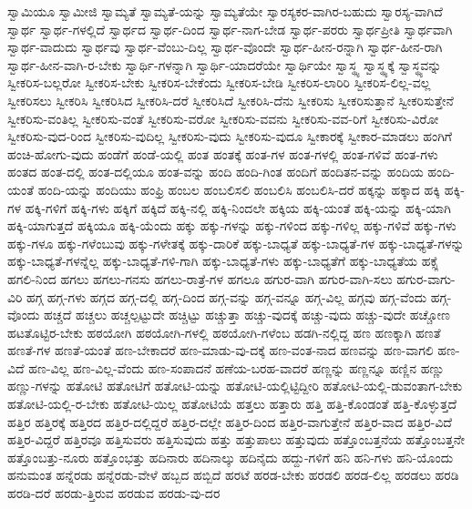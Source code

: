 {ಸ್ವಾಮಿಯೂ
ಸ್ವಾಮೀಜಿ
ಸ್ವಾಮ್ಯತೆ
ಸ್ವಾಮ್ಯತೆ-ಯನ್ನು
ಸ್ವಾಮ್ಯತೆಯೇ
ಸ್ವಾರಸ್ಯಕರ-ವಾಗಿರ-ಬಹುದು
ಸ್ವಾರಸ್ಯ-ವಾಗಿದೆ
ಸ್ವಾರ್ಥ
ಸ್ವಾರ್ಥ-ಗಳಲ್ಲಿದೆ
ಸ್ವಾರ್ಥದ
ಸ್ವಾರ್ಥ-ದಿಂದ
ಸ್ವಾರ್ಥ-ನಾಗ-ಬೇಡ
ಸ್ವಾರ್ಥ-ಪರರು
ಸ್ವಾರ್ಥಪ್ರೀತಿ
ಸ್ವಾರ್ಥವಾಗಿ
ಸ್ವಾರ್ಥ-ವಾದುದು
ಸ್ವಾರ್ಥವು
ಸ್ವಾರ್ಥ-ವೆಂಬು-ದಿಲ್ಲ
ಸ್ವಾರ್ಥ-ವೊಂದೇ
ಸ್ವಾರ್ಥ-ಹೀನ-ರನ್ನಾಗಿ
ಸ್ವಾರ್ಥ-ಹೀನ-ರಾಗಿ
ಸ್ವಾರ್ಥ-ಹೀನ-ವಾಗಿ-ರ-ಬೇಕು
ಸ್ವಾರ್ಥಿ-ಗಳನ್ನಾಗಿ
ಸ್ವಾರ್ಥಿ-ಯಾದರೆಯೇ
ಸ್ವಾರ್ಥಿಯೇ
ಸ್ವಾಸ್ಥ್ಯ
ಸ್ವಾಸ್ಥ್ಯಕ್ಕೆ
ಸ್ವಾಸ್ಥ್ಯವನ್ನು
ಸ್ವೀಕರಿಸ-ಬಲ್ಲರೋ
ಸ್ವೀಕರಿಸ-ಬೇಕು
ಸ್ವೀಕರಿಸ-ಬೇಕೆಂದು
ಸ್ವೀಕರಿಸ-ಬೇಡಿ
ಸ್ವೀಕರಿಸ-ಲಾರಿರಿ
ಸ್ವೀಕರಿಸ-ಲಿಲ್ಲ-ವಲ್ಲ
ಸ್ವೀಕರಿಸಲು
ಸ್ವೀಕರಿಸಿ
ಸ್ವೀಕರಿಸಿದ
ಸ್ವೀಕರಿಸಿ-ದರೆ
ಸ್ವೀಕರಿಸಿದೆ
ಸ್ವೀಕರಿಸಿ-ದೆನು
ಸ್ವೀಕರಿಸು
ಸ್ವೀಕರಿಸುತ್ತಾನೆ
ಸ್ವೀಕರಿಸುತ್ತೇನೆ
ಸ್ವೀಕರಿಸು-ವಂತಿಲ್ಲ
ಸ್ವೀಕರಿಸು-ವಂತೆ
ಸ್ವೀಕರಿಸು-ವರೋ
ಸ್ವೀಕರಿಸು-ವವನು
ಸ್ವೀಕರಿಸು-ವವ-ರಿಗೆ
ಸ್ವೀಕರಿಸು-ವಿರೋ
ಸ್ವೀಕರಿಸು-ವುದ-ರಿಂದ
ಸ್ವೀಕರಿಸು-ವುದಿಲ್ಲ
ಸ್ವೀಕರಿಸು-ವುದು
ಸ್ವೀಕರಿಸು-ವುದೂ
ಸ್ವೀಕಾರಕ್ಕೆ
ಸ್ವೀಕಾರ-ಮಾಡಲು
ಹಂಗಿಗೆ
ಹಂಚಿ-ಹೋಗು-ವುದು
ಹಂಡೆಗೆ
ಹಂಡೆ-ಯಲ್ಲಿ
ಹಂತ
ಹಂತಕ್ಕೆ
ಹಂತ-ಗಳ
ಹಂತ-ಗಳಲ್ಲಿ
ಹಂತ-ಗಳಿವೆ
ಹಂತ-ಗಳು
ಹಂತದ
ಹಂತ-ದಲ್ಲಿ
ಹಂತ-ದಲ್ಲಿಯೂ
ಹಂತ-ವನ್ನು
ಹಂದಿ
ಹಂದಿ-ಗಿಂತ
ಹಂದಿಗೆ
ಹಂದಿತನ-ವನ್ನು
ಹಂದಿಯ
ಹಂದಿ-ಯಂತೆ
ಹಂದಿ-ಯನ್ನು
ಹಂದಿಯು
ಹಂಫ್ರಿ
ಹಂಬಲ
ಹಂಬಲಿಸಲಿ
ಹಂಬಲಿಸಿ
ಹಂಬಲಿಸಿ-ದರೆ
ಹಕ್ಕನ್ನು
ಹಕ್ಕಾದ
ಹಕ್ಕಿ
ಹಕ್ಕಿ-ಗಳ
ಹಕ್ಕಿ-ಗಳಿಗೆ
ಹಕ್ಕಿ-ಗಳು
ಹಕ್ಕಿಗೆ
ಹಕ್ಕಿದೆ
ಹಕ್ಕಿ-ನಲ್ಲಿ
ಹಕ್ಕಿ-ನಿಂದಲೇ
ಹಕ್ಕಿಯ
ಹಕ್ಕಿ-ಯಂತೆ
ಹಕ್ಕಿ-ಯನ್ನು
ಹಕ್ಕಿ-ಯಾಗಿ
ಹಕ್ಕಿ-ಯಾಗುತ್ತದೆ
ಹಕ್ಕಿಯೂ
ಹಕ್ಕಿ-ಯೆಂದು
ಹಕ್ಕು
ಹಕ್ಕು-ಗಳನ್ನು
ಹಕ್ಕು-ಗಳಿಂದ
ಹಕ್ಕು-ಗಳಿಲ್ಲ
ಹಕ್ಕು-ಗಳಿವೆ
ಹಕ್ಕು-ಗಳು
ಹಕ್ಕು-ಗಳೂ
ಹಕ್ಕು-ಗಳೆಂಬುವು
ಹಕ್ಕು-ಗಳೇತಕ್ಕೆ
ಹಕ್ಕು-ದಾರಿಕೆ
ಹಕ್ಕು-ಬಾಧ್ಯತೆ
ಹಕ್ಕು-ಬಾಧ್ಯತೆ-ಗಳ
ಹಕ್ಕು-ಬಾಧ್ಯತೆ-ಗಳನ್ನು
ಹಕ್ಕು-ಬಾಧ್ಯತೆ-ಗಳನ್ನೆಲ್ಲ
ಹಕ್ಕು-ಬಾಧ್ಯತೆ-ಗಳಿ-ಗಾಗಿ
ಹಕ್ಕು-ಬಾಧ್ಯತೆ-ಗಳು
ಹಕ್ಕು-ಬಾಧ್ಯತೆಗೆ
ಹಕ್ಕು-ಬಾಧ್ಯತೆಯ
ಹಕ್ಸ್ಲೆ
ಹಗಲಿ-ನಿಂದ
ಹಗಲು
ಹಗಲು-ಗನಸು
ಹಗಲು-ರಾತ್ರೆ-ಗಳ
ಹಗಲೂ
ಹಗುರ-ವಾಗಿ
ಹಗುರ-ವಾಗಿ-ಸಲು
ಹಗುರ-ವಾಗು-ವಿರಿ
ಹಗ್ಗ
ಹಗ್ಗ-ಗಳು
ಹಗ್ಗದ
ಹಗ್ಗ-ದಲ್ಲಿ
ಹಗ್ಗ-ದಿಂದ
ಹಗ್ಗ-ವನ್ನು
ಹಗ್ಗ-ವನ್ನೂ
ಹಗ್ಗ-ವಿಲ್ಲ
ಹಗ್ಗವು
ಹಗ್ಗ-ವೆಂದು
ಹಗ್ಗ-ವೊಂದು
ಹಚ್ಚದೆ
ಹಚ್ಚಲು
ಹಚ್ಚಲ್ಪಟ್ಟುದೇ
ಹಚ್ಚಿಟ್ಟು
ಹಚ್ಚುತ್ತಾ
ಹಚ್ಚು-ವುದಕ್ಕೆ
ಹಚ್ಚು-ವುದು
ಹಚ್ಚು-ವುದೇ
ಹಚ್ಚೋಣ
ಹಟತೊಟ್ಟಿರ-ಬೇಕು
ಹಠಯೋಗಿ
ಹಠಯೋಗಿ-ಗಳಲ್ಲಿ
ಹಠಯೋಗಿ-ಗಳೆಂಬ
ಹಡಗಿ-ನಲ್ಲಿದ್ದ
ಹಣ
ಹಣಕ್ಕಾಗಿ
ಹಣತೆ
ಹಣತೆ-ಗಳ
ಹಣತೆ-ಯಂತೆ
ಹಣ-ಬೇಕಾದರೆ
ಹಣ-ಮಾಡು-ವು-ದಕ್ಕೆ
ಹಣ-ವಂತ-ನಾದ
ಹಣವನ್ನು
ಹಣ-ವಾಗಲಿ
ಹಣ-ವಿದೆ
ಹಣ-ವಿಲ್ಲ
ಹಣ-ವಿಲ್ಲ-ವೆಂದು
ಹಣ-ಸಂಪಾದನೆ
ಹಣೆಯ-ಬರಹ-ವಾದರೆ
ಹಣ್ಣನ್ನು
ಹಣ್ಣನ್ನೂ
ಹಣ್ಣಿನ
ಹಣ್ಣು
ಹಣ್ಣು-ಗಳನ್ನು
ಹತೋಟಿ
ಹತೋಟಿಗೆ
ಹತೋಟಿ-ಯನ್ನು
ಹತೋಟಿ-ಯಲ್ಲಿಟ್ಟಿದ್ದೀರಿ
ಹತೋಟಿ-ಯಲ್ಲಿ-ಡುವಂತಾಗ-ಬೇಕು
ಹತೋಟಿ-ಯಲ್ಲಿ-ರ-ಬೇಕು
ಹತೋಟಿ-ಯಿಲ್ಲ
ಹತೋಟಿಯೆ
ಹತ್ತಲು
ಹತ್ತಾರು
ಹತ್ತಿ
ಹತ್ತಿ-ಕೊಂಡಂತೆ
ಹತ್ತಿ-ಕೊಳ್ಳುತ್ತದೆ
ಹತ್ತಿರ
ಹತ್ತಿರಕ್ಕೆ
ಹತ್ತಿರದ
ಹತ್ತಿರ-ದಲ್ಲಿದ್ದರೆ
ಹತ್ತಿರ-ದಲ್ಲೇ
ಹತ್ತಿರ-ದಿಂದ
ಹತ್ತಿರ-ವಾಗುತ್ತೇನೆ
ಹತ್ತಿರ-ವಾದ
ಹತ್ತಿರ-ವಿದೆ
ಹತ್ತಿರ-ವಿದ್ದರೆ
ಹತ್ತಿರವೂ
ಹತ್ತಿಸುವರು
ಹತ್ತಿಸುವುದು
ಹತ್ತು
ಹತ್ತುಪಾಲು
ಹತ್ತುವುದು
ಹತ್ತೊಂಬತ್ತನೆಯ
ಹತ್ತೊಂಬತ್ತನೇ
ಹತ್ತೊಂಬತ್ತು-ನೂರು
ಹತ್ತೊಂಭತ್ತು
ಹದಿನಾರು
ಹದಿನಾಲ್ಕು
ಹದಿನೈದು
ಹದ್ದು-ಗಳಿಗೆ
ಹನಿ
ಹನಿ-ಗಳು
ಹನಿ-ಯೊಂದು
ಹನುಮಂತ
ಹನ್ನೆರಡು
ಹನ್ನೆರಡು-ವೇಳೆ
ಹಬ್ಬದ
ಹಬ್ಬಿದೆ
ಹರಟೆ
ಹರಡ-ಬೇಕು
ಹರಡಲಿ
ಹರಡ-ಲಿಲ್ಲ
ಹರಡಲು
ಹರಡಿ
ಹರಡಿ-ದರೆ
ಹರಡು-ತ್ತಿರುವ
ಹರಡುವ
ಹರಡು-ವು-ದರ
}
